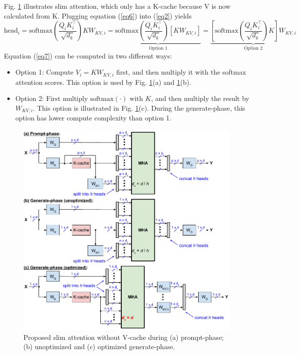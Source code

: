 \documentclass{article}
\begin{document}
Fig. \ref{fig3} illustrates slim attention, which only has a K-cache because V is now calculated from K. Plugging equation (\ref{eq6}) into (\ref{eq2}) yields
\begin{equation}
  \text{head}_i = \text{softmax} \left( \frac{Q_i K_i^\top}{\sqrt{d_k}} \right) K W_{KV,i}
  = \underbrace{ \text{softmax} \left( \frac{Q_i K_i^\top}{\sqrt{d_k}} \right) \left[ K W_{KV,i} \right] }_{\text{Option 1}}
  = \underbrace{ \left[ \text{softmax} \left( \frac{Q_i K_i^\top}{\sqrt{d_k}} \right) K \right] W_{KV,i} }_{\text{Option 2}}
\label{eq7} \end{equation}
Equation (\ref{eq7}) can be computed in two different ways:
\begin{itemize}[topsep=-1pt, itemsep=-1pt]
  \item Option 1: Compute $V_i = K W_{KV,i}$ first, and then multiply it with the softmax attention scores. This option is used by Fig. \ref{fig3}(a) and \ref{fig3}(b).
  \item Option 2: First multiply $\text{softmax}(\cdot)$ with $K$, and then multiply the result by $W_{KV,i}$.  This option is illustrated in Fig. \ref{fig3}(c). During the generate-phase, this option has lower compute complexity than option 1.
\end{itemize}

\begin{figure}[h!] \centering
  \includegraphics[scale=0.9]{figs/slim_fig3.pdf}
  \caption{Proposed slim attention without V-cache during (a) prompt-phase; (b) unoptimized and (c) optimized generate-phase.}
\label{fig3} \end{figure}
\end{document}
